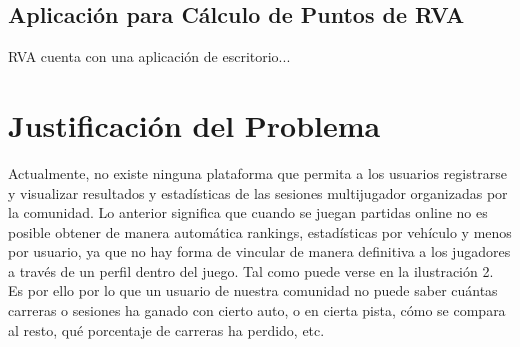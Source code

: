 \subsection{Aplicación para Cálculo de Puntos de RVA}
RVA cuenta con una aplicación de escritorio...

\section{Justificación del Problema}
Actualmente, no existe ninguna plataforma que permita a los usuarios registrarse y visualizar resultados y estadísticas de las sesiones multijugador organizadas por la comunidad. Lo anterior significa que cuando se juegan partidas online no es posible obtener de manera automática rankings, estadísticas por vehículo y menos por usuario, ya que no hay forma de vincular de manera definitiva a los jugadores a través de un perfil dentro del juego. Tal como puede verse en la ilustración 2. Es por ello por lo que un usuario de nuestra comunidad no puede saber cuántas carreras o sesiones ha ganado con cierto auto, o en cierta pista, cómo se compara al resto, qué porcentaje de carreras ha perdido, etc.



